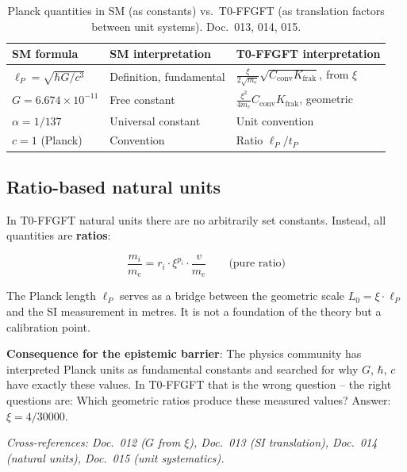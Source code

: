 \begin{table}[htbp]
\centering\small
\begin{tabular}{lll}
\toprule
\textbf{SM formula} & \textbf{SM interpretation} & \textbf{T0-FFGFT interpretation} \\
\midrule
$\ell_P = \sqrt{\hbar G/c^3}$ & Definition, fundamental & $\frac{\xi}{2\sqrt{m_e}}\sqrt{C_{\text{conv}}K_{\text{frak}}}$, from $\xi$ \\
$G = 6.674 \times 10^{-11}$   & Free constant           & $\frac{\xi^2}{4m_e}C_{\text{conv}}K_{\text{frak}}$, geometric \\
$\alpha = 1/137$               & Universal constant      & Unit convention \\
$c = 1$ (Planck)               & Convention              & Ratio $\ell_P/t_P$ \\
\bottomrule
\end{tabular}
\caption{Planck quantities in SM (as constants) vs.\ T0-FFGFT (as
translation factors between unit systems). Doc.~013, 014, 015.}
\label{tab:planck_translation_en}
\end{table}

\subsection{Ratio-based natural units}

In T0-FFGFT natural units there are no arbitrarily set constants.
Instead, all quantities are \textbf{ratios}:

\begin{equation}
    \frac{m_i}{m_e} = r_i \cdot \xi^{p_i} \cdot \frac{v}{m_e}
    \qquad \text{(pure ratio)}
\end{equation}

The Planck length $\ell_P$ serves as a bridge between the geometric
scale $L_0 = \xi \cdot \ell_P$ and the SI measurement in metres.
It is not a foundation of the theory but a calibration point.

\textbf{Consequence for the epistemic barrier}:
The physics community has interpreted Planck units as fundamental
constants and searched for why $G$, $\hbar$, $c$ have exactly these
values. In T0-FFGFT that is the wrong question -- the right questions are:
Which geometric ratios produce these measured values? Answer:
$\xi = 4/30000$.

\noindent\textit{Cross-references: Doc.~012 ($G$ from $\xi$),
Doc.~013 (SI translation), Doc.~014 (natural units),
Doc.~015 (unit systematics).}

